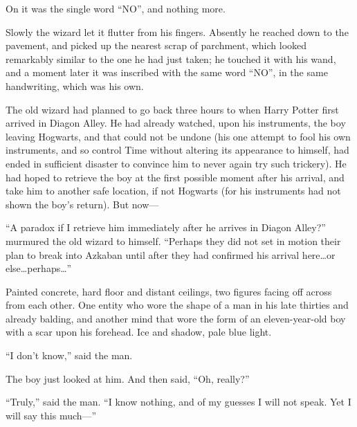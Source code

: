 On it was the single word “NO”, and nothing more.

Slowly the wizard let it flutter from his fingers. Absently he reached down to the pavement, and picked up the nearest scrap of parchment, which looked remarkably similar to the one he had just taken; he touched it with his wand, and a moment later it was inscribed with the same word “NO”, in the same handwriting, which was his own.

The old wizard had planned to go back three hours to when Harry Potter first arrived in Diagon Alley. He had already watched, upon his instruments, the boy leaving Hogwarts, and that could not be undone (his one attempt to fool his own instruments, and so control Time without altering its appearance to himself, had ended in sufficient disaster to convince him to never again try such trickery). He had hoped to retrieve the boy at the first possible moment after his arrival, and take him to another safe location, if not Hogwarts (for his instruments had not shown the boy’s return). But now—

“A paradox if I retrieve him immediately after he arrives in Diagon Alley?” murmured the old wizard to himself. “Perhaps they did not set in motion their plan to break into Azkaban until after they had confirmed his arrival here…or else…perhaps…”

\later

Painted concrete, hard floor and distant ceilings, two figures facing off across from each other. One entity who wore the shape of a man in his late thirties and already balding, and another mind that wore the form of an eleven-year-old boy with a scar upon his forehead. Ice and shadow, pale blue light.

“I don’t know,” said the man.

The boy just looked at him. And then said, “Oh, really?”

“Truly,” said the man. “I know nothing, and of my guesses I will not speak. Yet I will say this much—”

